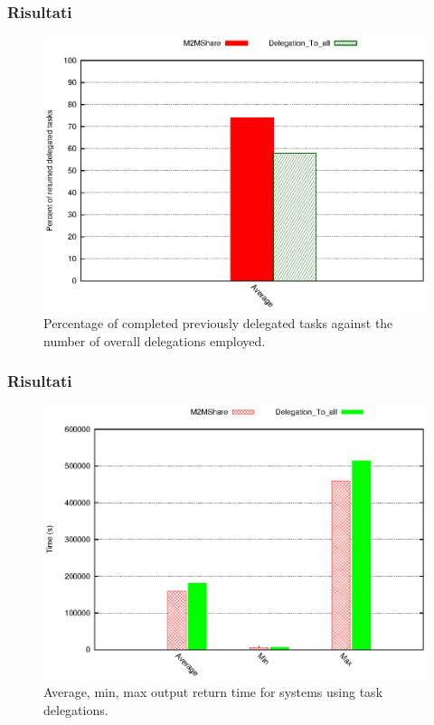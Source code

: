 \documentclass{beamer}
\begin{document}
\begin{frame}
\frametitle{Risultati}
\begin{center}
\begin{figure}[ht]
\includegraphics[scale=0.7]{../grafici/percDeleghe.eps}
\caption{Percentage of completed previously delegated tasks against the number of overall delegations employed.}
\end{figure}
\end{center}
\end{frame}

\begin{frame}
\frametitle{Risultati}
\begin{center}
\begin{figure}[ht]
\includegraphics[scale=0.7]{../grafici/tempiRitornoDeleghe.eps}
\caption{Average, min, max output return time for systems using task delegations.}
\end{figure}
\end{center}
\end{frame}
\end{document}
